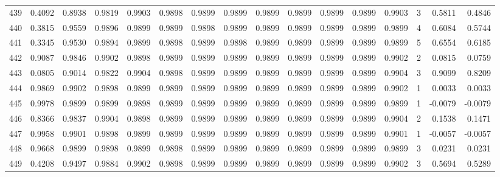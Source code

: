 \begin{tabular}{lrrrrrrrrrrrrrrr}
439 &      0.4092 &  0.8938 &  0.9819 &  0.9903 &  0.9898 &  0.9899 &  0.9899 &  0.9899 &  0.9899 &  0.9899 &   0.9899 &     0.9903 &      3 &                    0.5811 &                     0.4846 \\
440 &      0.3815 &  0.9559 &  0.9896 &  0.9899 &  0.9899 &  0.9898 &  0.9899 &  0.9899 &  0.9899 &  0.9899 &   0.9899 &     0.9899 &      4 &                    0.6084 &                     0.5744 \\
441 &      0.3345 &  0.9530 &  0.9894 &  0.9899 &  0.9898 &  0.9899 &  0.9898 &  0.9899 &  0.9899 &  0.9899 &   0.9899 &     0.9899 &      5 &                    0.6554 &                     0.6185 \\
442 &      0.9087 &  0.9846 &  0.9902 &  0.9898 &  0.9899 &  0.9899 &  0.9899 &  0.9899 &  0.9899 &  0.9899 &   0.9899 &     0.9902 &      2 &                    0.0815 &                     0.0759 \\
443 &      0.0805 &  0.9014 &  0.9822 &  0.9904 &  0.9898 &  0.9899 &  0.9899 &  0.9899 &  0.9899 &  0.9899 &   0.9899 &     0.9904 &      3 &                    0.9099 &                     0.8209 \\
444 &      0.9869 &  0.9902 &  0.9898 &  0.9899 &  0.9899 &  0.9899 &  0.9899 &  0.9899 &  0.9899 &  0.9899 &   0.9899 &     0.9902 &      1 &                    0.0033 &                     0.0033 \\
445 &      0.9978 &  0.9899 &  0.9899 &  0.9898 &  0.9899 &  0.9899 &  0.9899 &  0.9899 &  0.9899 &  0.9899 &   0.9899 &     0.9899 &      1 &                   -0.0079 &                    -0.0079 \\
446 &      0.8366 &  0.9837 &  0.9904 &  0.9898 &  0.9899 &  0.9899 &  0.9899 &  0.9899 &  0.9899 &  0.9899 &   0.9899 &     0.9904 &      2 &                    0.1538 &                     0.1471 \\
447 &      0.9958 &  0.9901 &  0.9898 &  0.9899 &  0.9899 &  0.9899 &  0.9899 &  0.9899 &  0.9899 &  0.9899 &   0.9899 &     0.9901 &      1 &                   -0.0057 &                    -0.0057 \\
448 &      0.9668 &  0.9899 &  0.9898 &  0.9899 &  0.9898 &  0.9899 &  0.9899 &  0.9899 &  0.9899 &  0.9899 &   0.9899 &     0.9899 &      3 &                    0.0231 &                     0.0231 \\
449 &      0.4208 &  0.9497 &  0.9884 &  0.9902 &  0.9898 &  0.9899 &  0.9899 &  0.9899 &  0.9899 &  0.9899 &   0.9899 &     0.9902 &      3 &                    0.5694 &                     0.5289 \\

\end{tabular}
